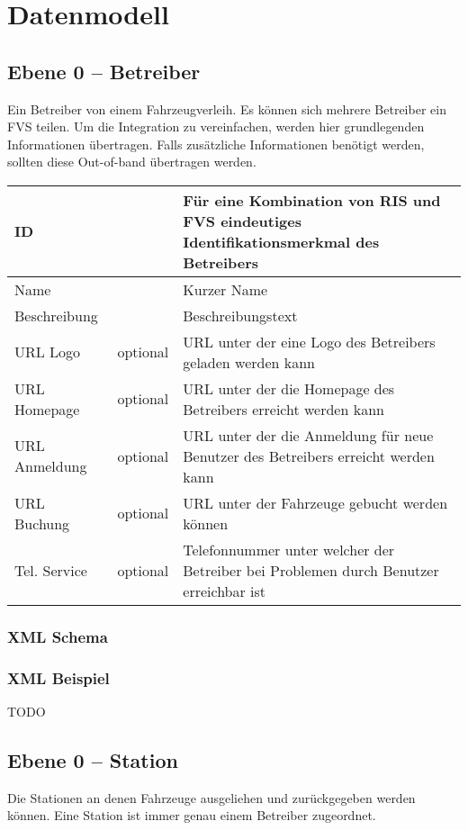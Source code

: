 \chapter{Datenmodell}
\label{sec:Datenmodell}

\section{Ebene 0 -- Betreiber}
Ein Betreiber von einem Fahrzeugverleih. Es können sich mehrere Betreiber ein FVS teilen. Um die Integration zu vereinfachen, werden hier grundlegenden Informationen übertragen. Falls zusätzliche Informationen benötigt werden, sollten diese Out-of-band übertragen werden.

\begin{tabular}{|p{3cm}|p{2cm}|p{8cm}|}
\hline
ID & & Für eine Kombination von RIS und FVS eindeutiges Identifikationsmerkmal des Betreibers \\
\hline
\hline
Name & & Kurzer Name \\
\hline
Beschreibung & & Beschreibungstext \\
\hline
URL Logo & optional & URL unter der eine Logo des Betreibers geladen werden kann \\
\hline
URL Homepage & optional & URL unter der die Homepage des Betreibers erreicht werden kann \\
\hline
URL Anmeldung & optional & URL unter der die Anmeldung für neue Benutzer des Betreibers erreicht werden kann \\
\hline
URL Buchung & optional & URL unter der Fahrzeuge gebucht werden können \\
\hline
Tel. Service & optional & Telefonnummer unter welcher der Betreiber bei Problemen durch Benutzer erreichbar ist \\
\hline
\end{tabular}

\subsection{XML Schema}


\subsection{XML Beispiel}
TODO
%

\section{Ebene 0 -- Station}
Die Stationen an denen Fahrzeuge ausgeliehen und zurückgegeben werden können. Eine Station ist immer genau einem Betreiber zugeordnet.

